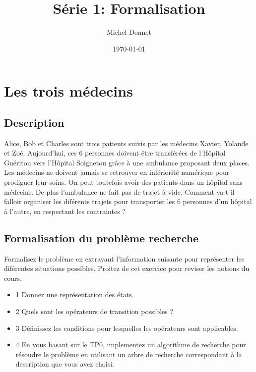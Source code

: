 \documentclass{article}
\title{Série 1: Formalisation}
\author{Michel Donnet}
\date{\today}
\begin{document}
\section{Les trois médecins}

\subsection{Description}

Alice, Bob et Charles sont trois patients suivis par les médecins Xavier,
Yolande et Zoé. Aujourd’hui, ces 6 personnes doivent être transférées de
l’Hôpital Guéritou vers l’Hôpital Soignetou grâce à une ambulance proposant
deux places. Les médecins ne doivent jamais se retrouver en infériorité
numérique pour prodiguer leur soins. On peut toutefois avoir des patients
dans un hôpital sans médecins. De plus l’ambulance ne fait pas de trajet à
vide.
Comment va-t-il falloir organiser les diférents trajets pour transporter
les 6 personnes d’un hôpital à l’autre, en respectant les contraintes ?

\subsection{Formalisation du problème recherche}
Formalisez le problème en extrayant l’information suisante pour représenter
les diférentes situations possibles. Proitez de cet exercice pour reviser les
notions du cours.

\begin{itemize}
  \item 1 Donnez une représentation des états.
  \item 2 Quels sont les opérateurs de transition possibles ?
  \item 3 Définissez les conditions pour lesquelles les opérateurs sont applicables.
  \item 4 En vous basant sur le TP0, implementez un algorithme de recherche
pour résoudre le problème en utilisant un arbre de recherche correspondant à la description que vous avez choisi.
\end{itemize}
\end{document}
